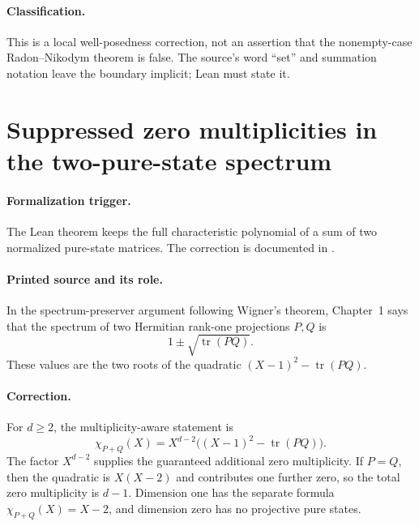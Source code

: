 \documentclass{article}
\begin{document}
\paragraph{Classification.}
This is a local well-posedness correction, not an assertion that the
nonempty-case Radon--Nikodym theorem is false. The source's word ``set'' and
summation notation leave the boundary implicit; Lean must state it.

\section{Suppressed zero multiplicities in the two-pure-state spectrum}
\label{sec:two-pure-state-spectrum}

\paragraph{Formalization trigger.}
The Lean theorem
 keeps the full
characteristic polynomial of a sum of two normalized pure-state matrices. The
correction is documented in
.

\paragraph{Printed source and its role.}
In the spectrum-preserver argument following Wigner's theorem, Chapter~1 says
that the spectrum of two Hermitian rank-one projections $P,Q$ is
\begin{equation}
  1\pm\sqrt{\operatorname{tr}(PQ)}.
\end{equation}
These values are the two roots of the quadratic
$(X-1)^2-\operatorname{tr}(PQ)$.

\paragraph{Correction.}
For $d\geq2$, the multiplicity-aware statement is
\begin{equation}
  \chi_{P+Q}(X)
  =X^{d-2}\bigl((X-1)^2-\operatorname{tr}(PQ)\bigr).
\end{equation}
The factor $X^{d-2}$ supplies the guaranteed additional zero multiplicity.
If $P=Q$, then the quadratic is $X(X-2)$ and contributes one further zero, so
the total zero multiplicity is $d-1$. Dimension one has the separate formula
$\chi_{P+Q}(X)=X-2$, and dimension zero has no projective pure states.
\end{document}
